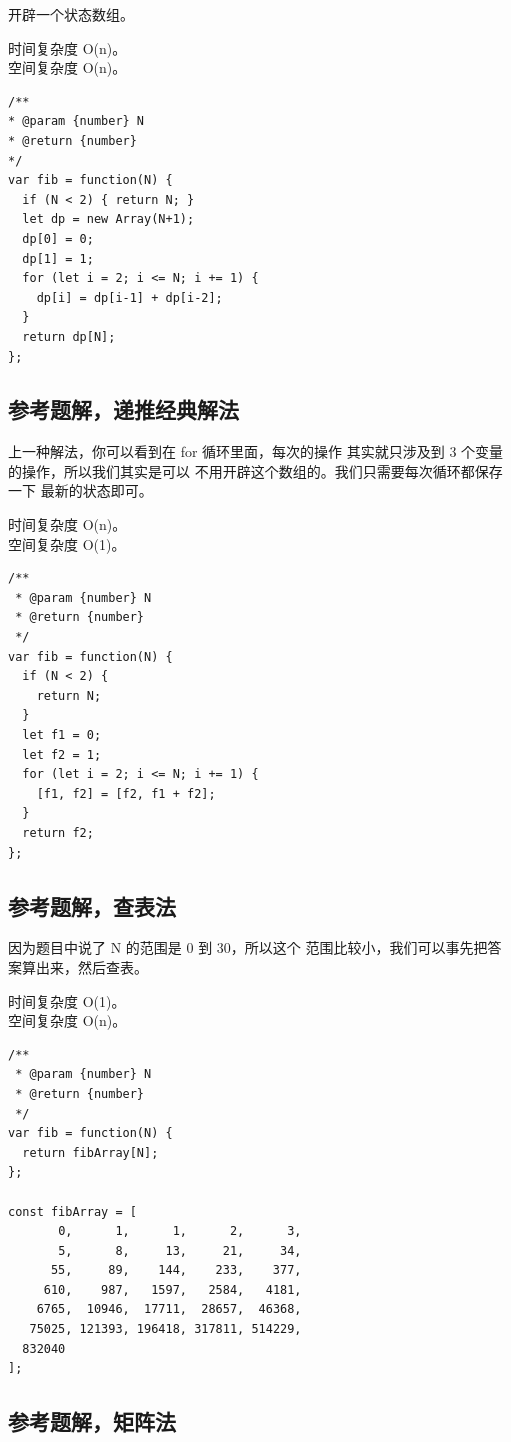 开辟一个状态数组。

时间复杂度 O(n)。\\
空间复杂度 O(n)。

\begin{verbatim}
/**
* @param {number} N
* @return {number}
*/
var fib = function(N) {
  if (N < 2) { return N; }
  let dp = new Array(N+1);
  dp[0] = 0;
  dp[1] = 1;
  for (let i = 2; i <= N; i += 1) {
    dp[i] = dp[i-1] + dp[i-2];
  }
  return dp[N];
};
\end{verbatim}

\subsection{参考题解，递推经典解法}

上一种解法，你可以看到在 for 循环里面，每次的操作
其实就只涉及到 3 个变量的操作，所以我们其实是可以
不用开辟这个数组的。我们只需要每次循环都保存一下
最新的状态即可。

时间复杂度 O(n)。\\
空间复杂度 O(1)。

\begin{verbatim}
/**
 * @param {number} N
 * @return {number}
 */
var fib = function(N) {
  if (N < 2) {
    return N;
  }
  let f1 = 0;
  let f2 = 1;
  for (let i = 2; i <= N; i += 1) {
    [f1, f2] = [f2, f1 + f2];
  }
  return f2;
};
\end{verbatim}

\subsection{参考题解，查表法}

因为题目中说了 N 的范围是 0 到 30，所以这个
范围比较小，我们可以事先把答案算出来，然后查表。

时间复杂度 O(1)。\\
空间复杂度 O(n)。

\begin{verbatim}
/**
 * @param {number} N
 * @return {number}
 */
var fib = function(N) {
  return fibArray[N];
};

const fibArray = [
       0,      1,      1,      2,      3,
       5,      8,     13,     21,     34,
      55,     89,    144,    233,    377,
     610,    987,   1597,   2584,   4181,
    6765,  10946,  17711,  28657,  46368,
   75025, 121393, 196418, 317811, 514229,
  832040
];
\end{verbatim}

\subsection{参考题解，矩阵法}

